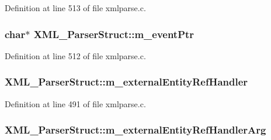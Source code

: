 Definition at line 513 of file xmlparse.\+c.

\subsubsection[{\texorpdfstring{m\+\_\+event\+Ptr}{m_eventPtr}}]{ char$\ast$ X\+M\+L\+\_\+\+Parser\+Struct\+::m\+\_\+event\+Ptr}\hypertarget{struct_x_m_l___parser_struct_aea08b96f41ce29438d0de87213341ab0}{}\label{struct_x_m_l___parser_struct_aea08b96f41ce29438d0de87213341ab0}


Definition at line 512 of file xmlparse.\+c.

\subsubsection[{\texorpdfstring{m\+\_\+external\+Entity\+Ref\+Handler}{m_externalEntityRefHandler}}]{ X\+M\+L\+\_\+\+Parser\+Struct\+::m\+\_\+external\+Entity\+Ref\+Handler}\hypertarget{struct_x_m_l___parser_struct_a15b31b68130723af3222a3f537f734c5}{}\label{struct_x_m_l___parser_struct_a15b31b68130723af3222a3f537f734c5}


Definition at line 491 of file xmlparse.\+c.

\subsubsection[{\texorpdfstring{m\+\_\+external\+Entity\+Ref\+Handler\+Arg}{m_externalEntityRefHandlerArg}}]{ X\+M\+L\+\_\+\+Parser\+Struct\+::m\+\_\+external\+Entity\+Ref\+Handler\+Arg}\hypertarget{struct_x_m_l___parser_struct_a3cac7d85828459eb9154eaff06125762}{}\label{struct_x_m_l___parser_struct_a3cac7d85828459eb9154eaff06125762}


